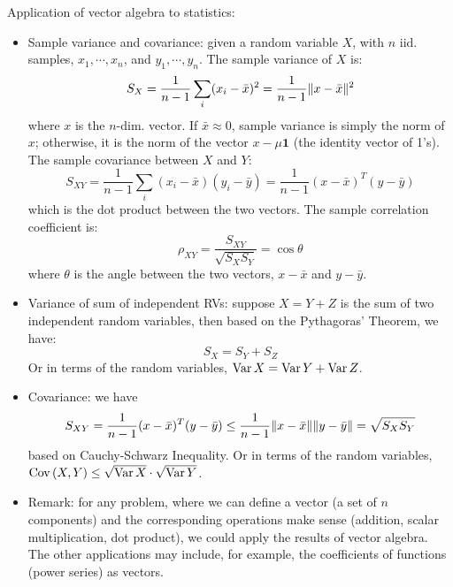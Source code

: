 \documentclass{report}
\begin{document}
Application of vector algebra to statistics: 
\begin{itemize}
\item Sample variance and covariance: given a random variable $X$, with $n$ iid. samples, $x_1, \cdots, x_n$, and $y_1, \cdots, y_n$. The sample variance of $X$ is: 
\begin{equation}
S_X = \frac{1}{n-1} \sum_i (x_i - \bar{x})^2 = \frac{1}{n-1} \lVert x-\bar{x}\rVert^2
\end{equation}
where $x$ is the $n$-dim. vector. If $\bar{x} \approx 0$, sample variance is simply the norm of $x$; otherwise, it is the norm of the vector $x - \mu \mathbf{1}$ (the identity vector of 1's). The sample covariance between $X$ and $Y$: 
\begin{equation}
S_{XY} = 	\frac{1}{n-1} \sum_i (x_i - \bar{x}) (y_i - \bar{y}) = \frac{1}{n-1} (x-\bar{x})^T (y-\bar{y}) 
\end{equation}
which is the dot product between the two vectors. The sample correlation coefficient is: 
\begin{equation}
\rho_{XY} = \frac{S_{XY}}{\sqrt{S_X S_Y}}	= \cos \theta
\end{equation}
where $\theta$ is the angle between the two vectors, $x-\bar{x}$ and $y-\bar{y}$. 

\item Variance of sum of independent RVs: suppose $X = Y + Z$ is the sum of two independent random variables, then based on the Pythagoras' Theorem, we have: 
\begin{equation}
S_{X} =	S_{Y} + S_{Z}
\end{equation}
Or in terms of the random variables, ${\rm Var}\,{X} = {\rm Var}\,{Y} + {\rm Var}\,{Z}$. 

\item Covariance: we have 
\begin{equation}
S_{XY} = \frac{1}{n-1} (x-\bar{x})^T (y-\bar{y}) \leq \frac{1}{n-1} \lVert x-\bar{x}\rVert \lVert y-\bar{y}\rVert = \sqrt{S_X S_Y}
\end{equation}
based on Cauchy-Schwarz Inequality. Or in terms of the random variables, ${\rm Cov}\,(X,Y) \leq \sqrt{{\rm Var}\,{X}} \cdot \sqrt{{\rm Var}\,{Y}}$. 

\item Remark: for any problem, where we can define a vector (a set of $n$ components) and the corresponding operations make sense (addition, scalar multiplication, dot product), we could apply the results of vector algebra. The other applications may include, for example, the coefficients of functions (power series) as vectors. 
\end{itemize}
\end{document}
